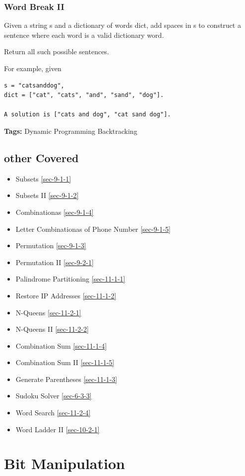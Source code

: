 \documentclass[12pt]{book}
\begin{document}
\subsection{Word Break II}
\label{sec-16-2-3}
Given a string s and a dictionary of words dict, add spaces in s to construct a sentence where each word is a valid dictionary word.

Return all such possible sentences.

For example, given
\lstset{language=java,label= ,caption= ,numbers=none}
\begin{lstlisting}
s = "catsanddog",
dict = ["cat", "cats", "and", "sand", "dog"].

A solution is ["cats and dog", "cat sand dog"].
\end{lstlisting}
\textbf{Tags:} Dynamic Programming Backtracking
\section{other Covered}
\label{sec-16-3}
\begin{itemize}
\item Subsets
\ref{sec-9-1-1}
\item Subsets II
\ref{sec-9-1-2}
\item Combinationas
\ref{sec-9-1-4}
\item Letter Combinationas of Phone Number
\ref{sec-9-1-5}
\item Permutation
\ref{sec-9-1-3}
\item Permutation II
\ref{sec-9-2-1}
\item Palindrome Partitioning 
\ref{sec-11-1-1}
\item Restore IP Addresses
\ref{sec-11-1-2}
\item N-Queens 
\ref{sec-11-2-1}
\item N-Queens II
\ref{sec-11-2-2}
\item Combination Sum
\ref{sec-11-1-4}
\item Combination Sum II
\ref{sec-11-1-5}
\item Generate Parentheses
\ref{sec-11-1-3}
\item Sudoku Solver
\ref{sec-6-3-3}
\item Word Search
\ref{sec-11-2-4}
\item Word Ladder II
\ref{sec-10-2-1}
\end{itemize}
\chapter{Bit Manipulation}
\label{sec-17}
\end{document}
